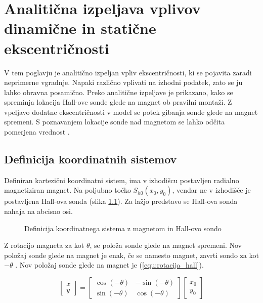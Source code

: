 \chapter{Analitična izpeljava vplivov dinamične in statične ekscentričnosti}

V tem poglavju je analitično izpeljan vpliv ekscentričnosti, ki se pojavita zaradi neprimerne vgradnje. Napaki različno vplivati na izhodni podatek, zato se ju lahko obravna posamično. Preko analitične izpeljave je prikazano, kako se spreminja lokacija Hall-ove sonde glede na magnet ob pravilni montaži. Z vpeljavo dodatne ekscentričnosti v model se potek gibanja sonde glede na magnet spremeni. S poznavanjem lokacije sonde nad magnetom se lahko odčita pomerjena vrednost \Bz.


\section{Definicija koordinatnih sistemov}

Definiran kartezični koordinatni sistem, ima v izhodišcu postavljen radialno magnetiziran magnet. Na poljubno točko $S_{h0}(x_0,y_0)$, vendar ne v izhodišče je postavljena Hall-ova sonda (slika \ref{fig:def_kks}). Za lažjo predstavo se Hall-ova sonda nahaja na abcisno osi.

\begin{figure}[h!]
	\centering
	\caption{Definicija koordinatnega sistema z magnetom in Hall-ovo sondo}
	\label{fig:def_kks}
\end{figure}

Z rotacijo magneta za kot $\theta$, se položa sonde glede na magnet spremeni. Nov položaj sonde glede na magnet je enak, če se namesto magnet, zavrti sondo za kot $-\theta$ . Nov položaj sonde glede na magnet je (\ref{equ:rotacija_hall}).

\begin{equation}
\label{equ:rotacija_hall}
\begin{bmatrix} x\\y \end{bmatrix}=
\begin{bmatrix} \cos(-\theta)&-\sin(-\theta)\\\sin(-\theta)&\cos(-\theta) \end{bmatrix}
\begin{bmatrix} x_0\\y_0 \end{bmatrix}
\end{equation}

